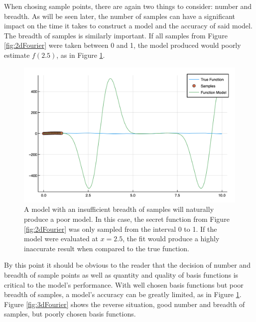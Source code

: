 \par When chosing sample points, there are again two things to consider: number and breadth. As will be seen later, the number of samples can have a significant impact on the time it takes to construct a model and the accuracy of said model. The breadth of samples is similarly important. If all samples from Figure \ref{fig:2dFourier} were taken between 0 and 1, the model produced would poorly estimate $f(2.5)$, as in Figure \ref{fig:poorSamps}. 

\begin{figure}[h]
\includegraphics[scale = 0.4]{Figures/poorSamps}
\caption{A model with an insufficient breadth of samples will naturally produce a poor model. In this case, the secret function from Figure \ref{fig:2dFourier} was only sampled from the interval 0 to 1. If the model were evaluated at $x=2.5$, the fit would produce a highly inaccurate result when compared to the true function.
\label{fig:poorSamps}} 
\end{figure}

\par By this point it should be obvious to the reader that the decision of number and breadth of sample points as well as quantity and quality of basis functions is critical to the model's performance. With well chosen basis functions but poor breadth of samples, a model's accuracy can be greatly limited, as in Figure \ref{fig:poorSamps}. Figure \ref{fig:3dFourier} shows the reverse situation, good number and breadth of samples, but poorly chosen basis functions. 


